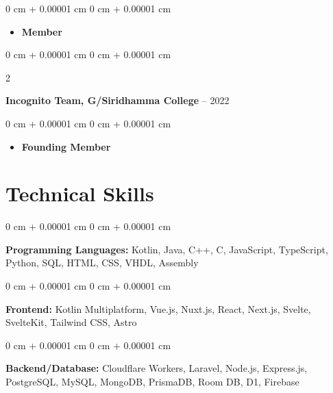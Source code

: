 \documentclass[10pt, letterpaper]{article}
\newenvironment{highlights}{
    \begin{itemize}[
        topsep=0.10 cm,
        parsep=0.10 cm,
        partopsep=0pt,
        itemsep=0pt,
        leftmargin=0 cm + 10pt
    ]
}{
    \end{itemize}
} %
\newenvironment{onecolentry}{
    \begin{adjustwidth}{
        0 cm + 0.00001 cm
    }{
        0 cm + 0.00001 cm
    }
}{
    \end{adjustwidth}
} %
\newenvironment{twocolentry}[2][]{
    \onecolentry
    \def\secondColumn{#2}
    \setcolumnwidth{\fill, 4.5 cm}
    \begin{paracol}{2}
}{
    \switchcolumn \raggedleft \secondColumn
    \end{paracol}
    \endonecolentry
} %
\begin{document}
        \vspace{0.10 cm}
        \begin{onecolentry}
            \begin{highlights}
                \item \textbf{Member}
            \end{highlights}
        \end{onecolentry}

        \vspace{0.30 cm}
        \begin{twocolentry}{
            2018 – 2022
        }
            \textbf{Incognito Team, G/Siridhamma College}\end{twocolentry}

        \vspace{0.10 cm}
        \begin{onecolentry}
            \begin{highlights}
                \item \textbf{Founding Member}
            \end{highlights}
        \end{onecolentry}


    \section{Technical Skills}




        \begin{onecolentry}
            \textbf{Programming Languages:} Kotlin, Java, C++, C, JavaScript, TypeScript, Python, SQL, HTML, CSS, VHDL, Assembly
        \end{onecolentry}

        \vspace{0.2 cm}

        \begin{onecolentry}
            \textbf{Frontend:} Kotlin Multiplatform, Vue.js, Nuxt.js, React, Next.js, Svelte, SvelteKit, Tailwind CSS, Astro
        \end{onecolentry}

        \vspace{0.2 cm}

        \begin{onecolentry}
            \textbf{Backend/Database:} Cloudflare Workers, Laravel, Node.js, Express.js, PostgreSQL, MySQL, MongoDB, PrismaDB, Room DB, D1, Firebase
        \end{onecolentry}
\end{document}
